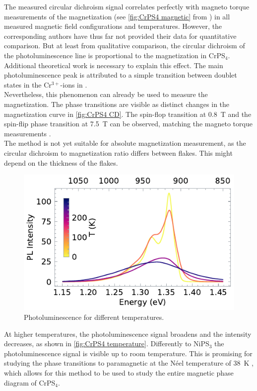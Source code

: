 \documentclass[
	oneside,
	parskip=half,
	a4paper,
]{scrbook}
\begin{document}
The measured circular dichroism signal correlates perfectly with magneto torque measurements of the magnetization (see \autoref{fig:CrPS4 magnetic} from \cite{CrPS4_magnetic}) in all measured magnetic field configurations and temperatures.
However, the corresponding authors have thus far not provided their data for quantitative comparison.
But at least from qualitative comparison, the circular dichroism of the photoluminescence line is proportional to the magnetization in CrPS$_4$.\\
Additional theoretical work is necessary to explain this effect.
The main photoluminescence peak is attributed to a simple transition between doublet states in the Cr$^{3+}$-ions in \cite{CrPS4_pl}.\todo{}\\
Nevertheless, this phenomenon can already be used to measure the magnetization.
The phase transitions are visible as distinct changes in the magnetization curve in \autoref{fig:CrPS4 CD}.
The spin-flop transition at \SI{.8}{T} and the spin-flip phase transition at \SI{7.5}{T} can be observed, matching the magneto torque measurements \cite{CrPS4_magnetic}.\\
The method is not yet suitable for absolute magnetization measurement, as the circular dichroism to magnetization ratio differs between flakes.
This might depend on the thickness of the flakes.


\begin{figure}
	\centering
	\includegraphics{../figures/2024-04-22 CrPS4 temperature series.pdf}
	\caption{Photoluminescence for different temperatures.}
	\label{fig:CrPS4 temperature}
\end{figure}
At higher temperatures, the photoluminescence signal broadens and the intensity decreases, as shown in \autoref{fig:CrPS4 temperature}.
Differently to NiPS$_3$ the photoluminescence signal is visible up to room temperature.
This is promising for studying the phase transitions to paramagnetic at the Néel temperature of \SI{38}{K} \cite{CrPS4_magnetic},
which allows for this method to be used to study the entire magnetic phase diagram of CrPS$_4$.
\end{document}
